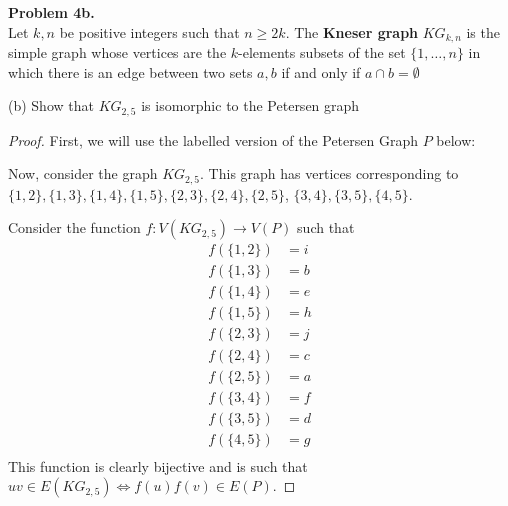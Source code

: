 \documentclass{article}
\newcommand{\set}[1]{\{#1\}}
\newenvironment{hwproof}[2]
{
    \textbf{Problem #1.}\\
    #2
    \begin{proof}
}{
    \end{proof}
    \newpage
}
\begin{document}
\begin{hwproof}
    {4b}
    {
        Let $k, n$ be positive integers such that $n \geq 2k$. The \textbf{Kneser graph}
        $KG_{k,n}$ is the simple graph whose vertices are the $k$-elements subsets of
        the set $\set{1,\dots,n}$ in which there is an edge between two sets $a,b$
        if and only if $a\cap b = \emptyset$

        (b) Show that $KG_{2,5}$ is isomorphic to the Petersen graph
    }
    First, we will use the labelled version of the Petersen Graph $P$ below:

    \begin{center}
    \end{center}

    Now, consider the graph $KG_{2,5}$. This graph has vertices corresponding to
    $\set{1,2}, \set{1,3}, \set{1,4}, \set{1, 5}, \set{2, 3}, \set{2, 4}, \set{2,5}$,
    $\set{3,4}, \set{3,5}, \set{4,5}$.

    Consider the function $f: V(KG_{2,5}) \to V(P)$ such that
    \begin{align*}
        f(\set{1, 2}) & = i \\
        f(\set{1, 3}) & = b \\
        f(\set{1, 4}) & = e \\
        f(\set{1, 5}) & = h \\
        f(\set{2, 3}) & = j \\
        f(\set{2, 4}) & = c \\
        f(\set{2, 5}) & = a \\
        f(\set{3, 4}) & = f \\
        f(\set{3, 5}) & = d \\
        f(\set{4, 5}) & = g \\
    \end{align*}
    This function is clearly bijective and is such that $uv \in E(KG_{2,5}) \iff f(u)f(v)\in E(P)$.
\end{hwproof}
\end{document}
